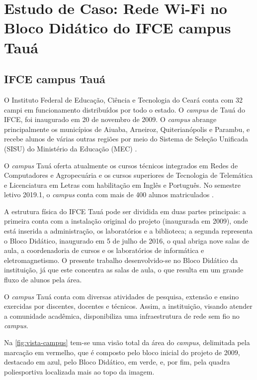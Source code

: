 \chapter{Estudo de Caso: Rede Wi-Fi no Bloco Didático do IFCE campus Tauá}
\label{cap:cap:estudo-de-caso}

\section{IFCE campus Tauá}
\label{sec:ifce-taua}

O Instituto Federal de Educação, Ciência e Tecnologia do Ceará conta com 32 campi em funcionamento distribuídos por todo o estado. O \textit{campus} de Tauá do IFCE, foi inaugurado em 20 de novembro de 2009. O \textit{campus} abrange principalmente os municípios de Aiuaba, Arneiroz, Quiterianópolis e Parambu, e recebe alunos de várias outras regiões por meio do Sistema de Seleção Unificada (SISU) do Ministério da Educação (MEC) \cite{ifceTaua2019}.

O \textit{campus} Tauá oferta atualmente os cursos técnicos integrados em Redes de Computadores e Agropecuária e os cursos superiores de Tecnologia de Telemática e Licenciatura em Letras com habilitação em Inglês e Português. No semestre letivo 2019.1, o \textit{campus} conta com mais de 400 alunos matriculados \cite{ifceTaua2019}.

A estrutura física do IFCE Tauá pode ser dividida em duas partes principais: a primeira conta com a instalação original do projeto (inaugurada em 2009), onde está inserida a administração, os laboratórios e a biblioteca; a segunda representa o Bloco Didático, inaugurado em 5 de julho de 2016, o qual abriga nove salas de aula, a coordenadoria de cursos e os laboratórios de informática e eletromagnetismo. O presente trabalho desenvolvido-se no Bloco Didático da instituição, já que este concentra as salas de aula, o que resulta em um grande fluxo de alunos pela área.

O \textit{campus} Tauá conta com diversas atividades de pesquisa, extensão e ensino exercidas por discentes, docentes e técnicos. Assim, a instituição, visando atender a comunidade acadêmica, disponibiliza uma infraestrutura de rede sem fio no \textit{campus}.

Na \autoref{fig:vista-campus} tem-se uma visão total da área do \textit{campus}, delimitada pela marcação em vermelho, que é composto pelo bloco inicial do projeto de 2009, destacado em azul, pelo Bloco Didático, em verde, e, por fim, pela quadra poliesportiva localizada mais ao topo da imagem.

